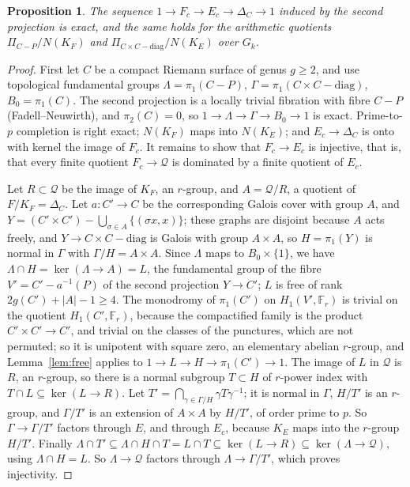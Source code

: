 \documentclass[11pt]{amsart}
\newtheorem{proposition}[thm]{Proposition}
\theoremstyle{remark}
\newcommand{\F}{\mathbb F}
\begin{document}
\begin{proposition}\label{prop:exact}
The sequence $1\to F_c\to E_c\to\Delta_C\to1$ induced by the second projection is exact, and the same holds for the arithmetic quotients $\Pi_{C-P}/N(K_F)$ and $\Pi_{C\times C-\mathrm{diag}}/N(K_E)$ over $G_k$.
\end{proposition}

\begin{proof}
First let $C$ be a compact Riemann surface of genus $g\ge2$, and use topological fundamental groups $\Lambda=\pi_1(C-P)$, $\Gamma=\pi_1(C\times C-\mathrm{diag})$, $B_0=\pi_1(C)$. The second projection is a locally trivial fibration with fibre $C-P$ (Fadell--Neuwirth), and $\pi_2(C)=0$, so $1\to\Lambda\to\Gamma\to B_0\to1$ is exact. Prime-to-$p$ completion is right exact; $N(K_F)$ maps into $N(K_E)$; and $E_c\to\Delta_C$ is onto with kernel the image of $F_c$. It remains to show that $F_c\to E_c$ is injective, that is, that every finite quotient $F_c\to\mathcal Q$ is dominated by a finite quotient of $E_c$.

Let $R\subset\mathcal Q$ be the image of $K_F$, an $r$-group, and $A=\mathcal Q/R$, a quotient of $F/K_F=\Delta_C$. Let $a\colon C'\to C$ be the corresponding Galois cover with group $A$, and $Y=(C'\times C')-\bigcup_{\sigma\in A}\{(\sigma x,x)\}$; these graphs are disjoint because $A$ acts freely, and $Y\to C\times C-\mathrm{diag}$ is Galois with group $A\times A$, so $H=\pi_1(Y)$ is normal in $\Gamma$ with $\Gamma/H=A\times A$. Since $\Lambda$ maps to $B_0\times\{1\}$, we have $\Lambda\cap H=\ker(\Lambda\to A)=L$, the fundamental group of the fibre $V'=C'-a^{-1}(P)$ of the second projection $Y\to C'$; $L$ is free of rank $2g(C')+|A|-1\ge4$. The monodromy of $\pi_1(C')$ on $H_1(V',\F_r)$ is trivial on the quotient $H_1(C',\F_r)$, because the compactified family is the product $C'\times C'\to C'$, and trivial on the classes of the punctures, which are not permuted; so it is unipotent with square zero, an elementary abelian $r$-group, and Lemma~\ref{lem:free} applies to $1\to L\to H\to\pi_1(C')\to1$. The image of $L$ in $\mathcal Q$ is $R$, an $r$-group, so there is a normal subgroup $T\subset H$ of $r$-power index with $T\cap L\subseteq\ker(L\to R)$. Let $T'=\bigcap_{\gamma\in\Gamma/H}\gamma T\gamma^{-1}$; it is normal in $\Gamma$, $H/T'$ is an $r$-group, and $\Gamma/T'$ is an extension of $A\times A$ by $H/T'$, of order prime to $p$. So $\Gamma\to\Gamma/T'$ factors through $E$, and through $E_c$, because $K_E$ maps into the $r$-group $H/T'$. Finally $\Lambda\cap T'\subseteq\Lambda\cap H\cap T=L\cap T\subseteq\ker(L\to R)\subseteq\ker(\Lambda\to\mathcal Q)$, using $\Lambda\cap H=L$. So $\Lambda\to\mathcal Q$ factors through $\Lambda\to\Gamma/T'$, which proves injectivity.


\end{proof}
\end{document}
